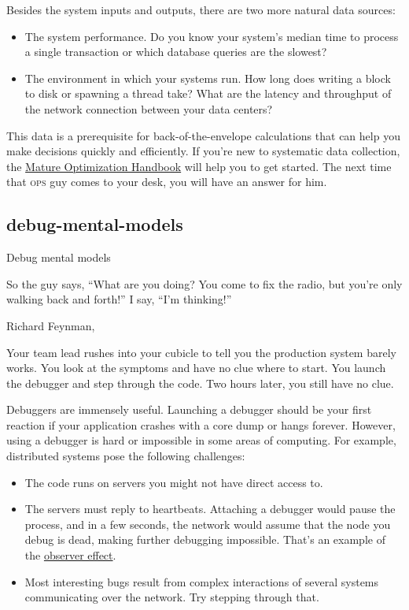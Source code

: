 \documentclass{article}
\begin{document}
Besides the system inputs and outputs, there are two more natural data sources:
\begin{itemize}
\item The system performance.
Do you know your system's median time to process a single transaction or which database queries are the slowest?
\item The environment in which your systems run.
How long does writing a block to disk or spawning a thread take?
What are the latency and throughput of the network connection between your data centers?
\end{itemize}

This data is a prerequisite for back-of-the-envelope calculations that can help you make decisions quickly and efficiently.
If you're new to systematic data collection,
the \href{https://carlos.bueno.org/optimization/}{Mature Optimization Handbook} will help you to get started.
The next time that \textsc{ops} guy comes to your desk,
you will have an answer for him.

\subsection{debug-mental-models}{Debug mental models}
\epigraph{
    So the guy says, ``What are you doing? You come to fix the radio, but you're only walking back and forth!''
    I say, ``I'm thinking!''
}{Richard Feynman, \cite{Surely You're Joking, Mr. Feynman!}}

Your team lead rushes into your cubicle to tell you the production system barely works.
You look at the symptoms and have no clue where to start.
You launch the debugger and step through the code.
Two hours later, you still have no clue.

Debuggers are immensely useful.
Launching a debugger should be your first reaction if your application crashes with a core dump or hangs forever.
However, using a debugger is hard or impossible in some areas of computing.
For example, distributed systems pose the following challenges:
\begin{itemize}
\item The code runs on servers you might not have direct access to.
\item The servers must reply to heartbeats.
Attaching a debugger would pause the process, and in a few seconds, the network would assume that the node you debug is dead, making further debugging impossible.
That's an example of the \href{https://en.wikipedia.org/wiki/Observer_effect_(physics)}{observer effect}.
\item
Most interesting bugs result from complex interactions of several systems communicating over the network.
Try stepping through that.
\end{itemize}
\end{document}
